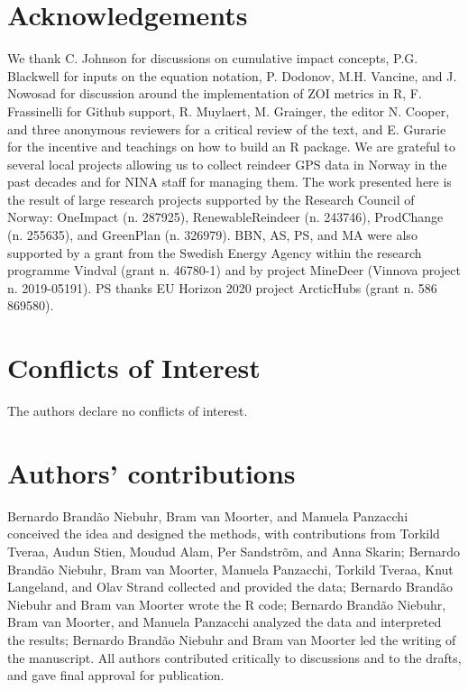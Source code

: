 \documentclass[titlepage]{article}
\begin{document}
\section*{Acknowledgements}

We thank C. Johnson for discussions on cumulative impact concepts, P.G. Blackwell for inputs on the equation notation, P. Dodonov, M.H. Vancine, and J. Nowosad for discussion around the implementation of ZOI metrics in R, F. Frassinelli for Github support, R. Muylaert, M. Grainger, the editor N. Cooper, and three anonymous reviewers for a critical review of the text, and E. Gurarie for the incentive and teachings on how to build an R package. We are grateful to several local projects allowing us to collect reindeer GPS data in Norway in the past decades and for NINA staff for managing them. The work presented here is the result of large research projects supported by the Research Council of Norway: OneImpact (n. 287925), RenewableReindeer (n. 243746), ProdChange (n. 255635), and GreenPlan (n. 326979). BBN, AS, PS, and MA were also supported by a grant from the Swedish Energy Agency within the research programme Vindval (grant n. 46780-1) and by project MineDeer (Vinnova project n. 2019-05191). PS thanks EU Horizon 2020 project ArcticHubs (grant n. 586 869580).

\section*{Conflicts of Interest}

The authors declare no conflicts of interest.

\section*{Authors’ contributions}

Bernardo Brandão Niebuhr, Bram van Moorter, and Manuela Panzacchi conceived the idea and designed the methods, with contributions from Torkild Tveraa, Audun Stien, Moudud Alam, Per Sandstrõm, and Anna Skarin; Bernardo Brandão Niebuhr, Bram van Moorter, Manuela Panzacchi, Torkild Tveraa, Knut Langeland, and Olav Strand collected and provided the data; Bernardo Brandão Niebuhr and Bram van Moorter wrote the R code; Bernardo Brandão Niebuhr, Bram van Moorter, and Manuela Panzacchi analyzed the data and interpreted the results; Bernardo Brandão Niebuhr and Bram van Moorter led the writing of the manuscript. All authors contributed critically to discussions and to the drafts, and gave final approval for publication.
\end{document}
